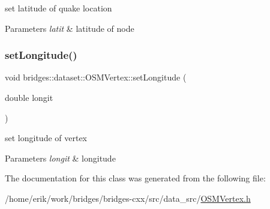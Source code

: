 set latitude of quake location


\begin{DoxyParams}{Parameters}
{\em latit} & latitude of node \\
\hline
\end{DoxyParams}
\mbox{\label{classbridges_1_1dataset_1_1_o_s_m_vertex_a48e077133233ba705342ba955c6fdc23}} 
\subsubsection{\texorpdfstring{set\+Longitude()}{setLongitude()}}
{\footnotesize\ttfamily void bridges\+::dataset\+::\+O\+S\+M\+Vertex\+::set\+Longitude (\begin{DoxyParamCaption}\item[{double}]{longit }\end{DoxyParamCaption})\hspace{0.3cm}{\ttfamily [inline]}}

set longitude of vertex


\begin{DoxyParams}{Parameters}
{\em longit} & longitude \\
\hline
\end{DoxyParams}


The documentation for this class was generated from the following file\+:\begin{DoxyCompactItemize}
\item 
/home/erik/work/bridges/bridges-\/cxx/src/data\+\_\+src/\hyperlink{_o_s_m_vertex_8h}{O\+S\+M\+Vertex.\+h}\end{DoxyCompactItemize}

